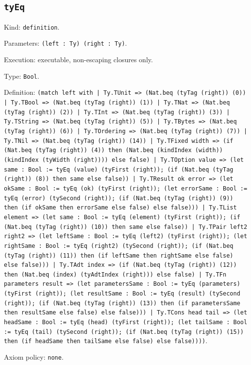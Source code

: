 \documentclass[11pt]{article}
\begin{document}
\subsection*{\texttt{tyEq}}
\noindent Kind: \texttt{definition}.\par
\noindent Parameters: \texttt{(left : Ty) (right : Ty)}.\par
\noindent Execution: executable, non-escaping closures only.\par
\noindent Type: \texttt{Bool}.\par
\noindent Definition: \texttt{(match left with | Ty.TUnit => (Nat.beq (tyTag (right)) (0)) | Ty.TBool => (Nat.beq (tyTag (right)) (1)) | Ty.TNat => (Nat.beq (tyTag (right)) (2)) | Ty.TInt => (Nat.beq (tyTag (right)) (3)) | Ty.TString => (Nat.beq (tyTag (right)) (5)) | Ty.TBytes => (Nat.beq (tyTag (right)) (6)) | Ty.TOrdering => (Nat.beq (tyTag (right)) (7)) | Ty.TNil => (Nat.beq (tyTag (right)) (14)) | Ty.TFixed width => (if (Nat.beq (tyTag (right)) (4)) then (Nat.beq (kindIndex (width)) (kindIndex (tyWidth (right)))) else false) | Ty.TOption value => (let same : Bool := tyEq (value) (tyFirst (right)); (if (Nat.beq (tyTag (right)) (8)) then same else false)) | Ty.TResult ok error => (let okSame : Bool := tyEq (ok) (tyFirst (right)); (let errorSame : Bool := tyEq (error) (tySecond (right)); (if (Nat.beq (tyTag (right)) (9)) then (if okSame then errorSame else false) else false))) | Ty.TList element => (let same : Bool := tyEq (element) (tyFirst (right)); (if (Nat.beq (tyTag (right)) (10)) then same else false)) | Ty.TPair left2 right2 => (let leftSame : Bool := tyEq (left2) (tyFirst (right)); (let rightSame : Bool := tyEq (right2) (tySecond (right)); (if (Nat.beq (tyTag (right)) (11)) then (if leftSame then rightSame else false) else false))) | Ty.TAdt index => (if (Nat.beq (tyTag (right)) (12)) then (Nat.beq (index) (tyAdtIndex (right))) else false) | Ty.TFn parameters result => (let parametersSame : Bool := tyEq (parameters) (tyFirst (right)); (let resultSame : Bool := tyEq (result) (tySecond (right)); (if (Nat.beq (tyTag (right)) (13)) then (if parametersSame then resultSame else false) else false))) | Ty.TCons head tail => (let headSame : Bool := tyEq (head) (tyFirst (right)); (let tailSame : Bool := tyEq (tail) (tySecond (right)); (if (Nat.beq (tyTag (right)) (15)) then (if headSame then tailSame else false) else false))))}.\par
\noindent Axiom policy: \texttt{none}.\par
\end{document}
